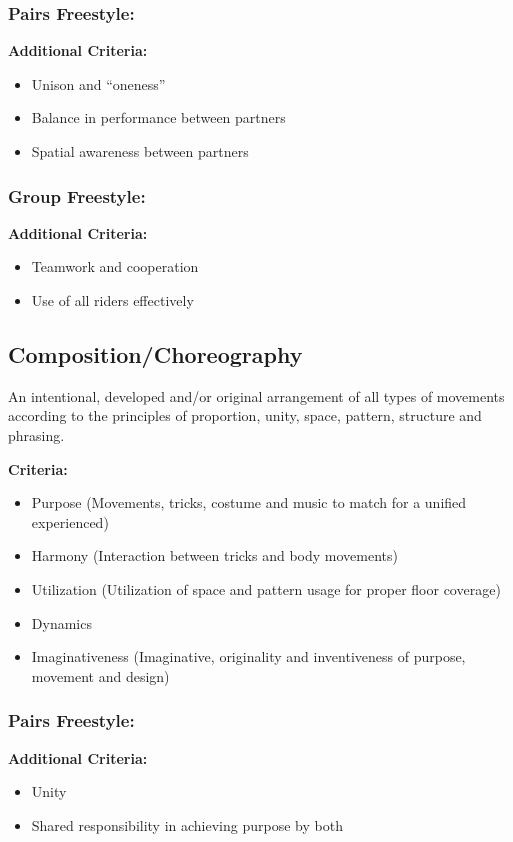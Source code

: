 \subsubsection{Pairs Freestyle:}
\textbf{Additional Criteria:}
\begin{itemize}
\item Unison and ``oneness''
\item Balance in performance between partners
\item Spatial awareness between partners
\end{itemize}

\subsubsection{Group Freestyle:}
\textbf{Additional Criteria:}
\begin{itemize}
\item Teamwork and cooperation
\item Use of all riders effectively
\end{itemize}

\subsection{Composition/Choreography}
An intentional, developed and/or original arrangement of all types of movements according to the principles of proportion, unity, space, pattern, structure and phrasing.

\textbf{Criteria:}
\begin{itemize}
\item Purpose (Movements, tricks, costume and music to match for a unified experienced)
\item Harmony (Interaction between tricks and body movements)
\item Utilization (Utilization of space and pattern usage for proper floor coverage)
\item Dynamics
\item Imaginativeness (Imaginative, originality and inventiveness of purpose, movement and design)
\end{itemize}

\subsubsection{Pairs Freestyle:}
\textbf{Additional Criteria:}
\begin{itemize}
\item Unity
\item Shared responsibility in achieving purpose by both
\end{itemize}


